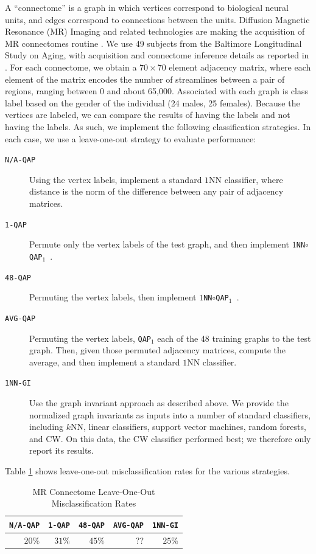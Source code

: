 \documentclass{article} %
\newcommand{\qapa}{\texttt{QAP}$_1$ }
\begin{document}
A ``connectome'' is a graph in which vertices correspond to biological neural units, and edges correspond to connections between the units.  Diffusion Magnetic Resonance (MR) Imaging and related technologies are making the acquisition of MR connectomes routine \cite{Hagmann2010}.  We use 49 subjects from the Baltimore Longitudinal Study on Aging, with acquisition and connectome inference details as reported in \cite{OHBM10}.  For each connectome, we obtain a $70 \times 70$ element adjacency matrix, where each element of the matrix encodes the number of streamlines between a pair of regions, ranging between 0 and about 65,000.  Associated with each graph is class label based on the gender of the individual (24 males, 25 females).  Because the vertices are labeled, we can compare the results of having the labels and not having the labels.  As such, we implement the following classification strategies.  In each case, we use a leave-one-out strategy to evaluate performance:

\begin{description}
	\item[\texttt{N/A-QAP}] Using the vertex labels, implement a standard $1$NN classifier, where distance is the norm of the difference between any pair of adjacency matrices.
	\item[\texttt{1-QAP}] Permute only the vertex labels of the test graph, and then implement \texttt{$1$NN$\circ$\qapa}.
	\item[\texttt{48-QAP}] Permuting the vertex labels, then implement \texttt{$1$NN$\circ$\qapa}.
	\item[\texttt{AVG-QAP}] Permuting the vertex labels, \qapa each of the 48 training graphs to the test graph.  Then, given those permuted adjacency matrices, compute the average, and then implement a standard $1$NN classifier.
	\item[\texttt{1NN-GI}] Use the graph invariant approach as described above. We provide the normalized graph invariants as inputs into a number of standard classifiers, including $k$NN, linear classifiers, support vector machines, random forests, and CW. On this data, the CW classifier performed best; we therefore only report its results.
\end{description}

Table \ref{tab:connectome} shows leave-one-out misclassification rates for the various strategies.


\begin{table}[h!]
\caption{MR Connectome Leave-One-Out Misclassification Rates}
\begin{center}
\begin{tabular}{|r|r|r|r|r|}
\hline
\texttt{N/A-QAP} & \texttt{1-QAP} & \texttt{48-QAP} & \texttt{AVG-QAP} & \texttt{1NN-GI}\\
\hline
$20\%$ & $31\%$ & $45\%$ & ?? & $25\%$ \\
    \hline
\end{tabular}
\end{center}
\label{tab:connectome}
\end{table}%
\end{document}
